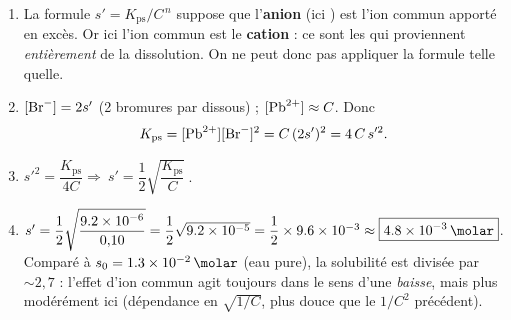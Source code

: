 \documentclass[11pt,a4paper]{article}
\newcommand{\Kps}{K_{\mathrm{ps}}}
\begin{document}
\begin{correction}
\begin{enumerate}[label=\textbf{\alph*)},leftmargin=2.2em,topsep=2pt,itemsep=2pt]
  \item La formule $s'=\Kps/C^{\,n}$ suppose que l'\textbf{anion} (ici ) est l'ion commun apporté
        en excès. Or ici l'ion commun est le \textbf{cation } : ce sont les  qui
        proviennent \emph{entièrement} de la dissolution. On ne peut donc pas appliquer la formule
        telle quelle.
  \item $[\ce{Br-}]=2s'$ (2 bromures par  dissous) ; $[\ce{Pb^2+}]\approx C$. Donc
        \[ \Kps=[\ce{Pb^2+}][\ce{Br-}]^{2}=C\,(2s')^{2}=4\,C\,s'^{2}. \]
  \item $s'^{2}=\dfrac{\Kps}{4C}\Rightarrow \boxed{\ s'=\dfrac{1}{2}\sqrt{\dfrac{\Kps}{C}}\ }$.
  \item $s'=\dfrac{1}{2}\sqrt{\dfrac{\num{9{,}2e-6}}{0{,}10}}=\dfrac{1}{2}\sqrt{\num{9{,}2e-5}}
        =\dfrac{1}{2}\times\num{9{,}6e-3}\approx\boxed{\qty{4{,}8e-3}{\molar}}$.
        Comparé à $s_0=\qty{1{,}3e-2}{\molar}$ (eau pure), la solubilité est divisée par $\sim 2{,}7$ :
        l'effet d'ion commun agit toujours dans le sens d'une \emph{baisse}, mais plus modérément ici
        (dépendance en $\sqrt{1/C}$, plus douce que le $1/C^{2}$ précédent).
\end{enumerate}
\end{correction}
\end{document}
